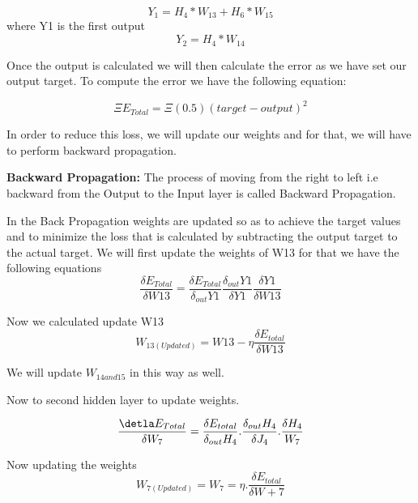 \begin{equation}
 Y_{1}=H_{4}*W_{13}+H_{6}*W_{15}   
\end{equation}
where Y1 is the first output
\begin{equation}
Y_{2} = H_{4}*W_{14}    
\end{equation}

Once the output is calculated we will then calculate the error as we have set our output target. To compute the error we have the following equation:

\begin{equation}
\Xi E_{Total} = \Xi (0.5)(target - output)^2    
\end{equation}

In order to reduce this loss, we will update our weights and for that, we will have to perform backward propagation.

\textbf{Backward Propagation:}
The process of moving from the right to left i.e backward from the Output to the Input layer is called Backward Propagation.

In the Back Propagation weights are updated so as to achieve the target values and to minimize the loss that is calculated by subtracting the output target to the actual target. We will first update the weights of W13 for that we have the following equations
\begin{equation}
\frac{\delta E_{Total}}{\delta W 13} = \frac{\delta E_{Total}}{\delta_{out} Y1} \frac{\delta_{out}Y1}{\delta Y1}  \frac{\delta Y1}{\delta W13}     
\end{equation}
 
Now we calculated update W13
\begin{equation}
W_{13(Updated)} = W13-\eta \frac{\delta E_{total}}{\delta W13}    
\end{equation}

We will update $W_{14 and 15}$ in this way as well.

Now to second hidden layer to update weights.

\begin{equation}
    \frac{\detla E_{Total}}{\delta W_{7}} = \frac{\delta E_{total}}{\delta_{out} H_{4}}.\frac{\delta_{out} H_{4}}{\delta J_{4}}.\frac{\delta H_{4}}{W_{7}}
\end{equation}

Now updating the weights
\begin{equation}
    W_{7(Updated)} = W_{7} = \eta . \frac{\delta E_{total}}{\delta W+{7}}
\end{equation}

